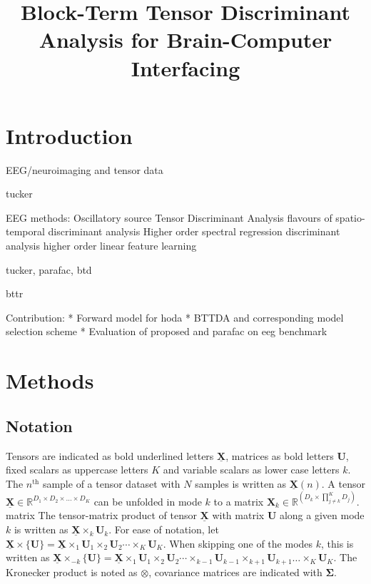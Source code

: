\documentclass[twocolumn]{article}
\title{Block-Term Tensor Discriminant Analysis for Brain-Computer Interfacing}
\newcommand{\ten}[1]{\underline{\mathbf{#1}}} %
\newcommand{\mat}[1]{\mathbf{#1}} %
\newcommand{\mpr}[2]{\times_{#2} {#1}_{#2}} %
\newcommand{\mmpr}[1]{\times\{#1\}} %
\newcommand{\mmprs}[2]{\times_{-#2}\{#1\}} %
\begin{document}
\maketitle

\section{Introduction}

EEG/neuroimaging and tensor data

tucker

EEG methods:
Oscillatory source Tensor Discriminant Analysis
flavours of spatio-temporal discriminant analysis
Higher order spectral regression discriminant analysis
higher order linear feature learning

tucker, parafac, btd

bttr



Contribution:
* Forward model for hoda
* BTTDA and corresponding model selection scheme
* Evaluation of proposed and parafac on eeg benchmark
\section{Methods}

\subsection{Notation}
Tensors are indicated as bold underlined letters $\ten{X}$, matrices as bold
letters $\mat{U}$, fixed scalars as uppercase letters $K$ and variable
scalars as lower case letters $k$.
The $n^\text{th}$ sample of a tensor dataset with $N$ samples is written as
$\ten{X}(n)$.
A tensor $\ten{X}\in \mathbb{R}^{D_1\times D_2 \times \ldots \times D_K}$ can be unfolded in mode
$k$ to a matrix $\mat{X}_k\in\mathbb{R}^{(D_k\times\prod_{j\neq k}^K D_j)}$.
matrix
The tensor-matrix product of tensor $\ten{X}$ with matrix $\mat{U}$ along a
given mode $k$ is written as $\ten{X}\mpr{\mat{U}}{k}$. For ease of notation, let
$\ten{X}\mmpr{\mat{U}} =
	\ten{X}\mpr{\mat{U}}{1}\mpr{\mat{U}}{2}\cdots\mpr{\mat{U}}{K}$.
When skipping one of the modes $k$, this is
written as $\ten{X}\mmprs{\mat{U}}{k} =
	\ten{X}\mpr{\mat{U}}{1}\mpr{\mat{U}}{2}\cdots\mpr{\mat{U}}{k-1}\mpr{\mat{U}}{k+1}\ldots\mpr{\mat{U}}{K}$.
The Kronecker product is noted as $\otimes$, covariance matrices are indicated  with $\mat{\Sigma}$.
\end{document}
